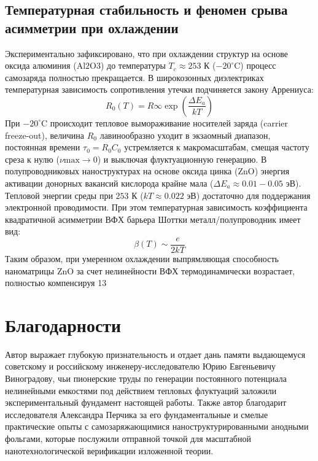 \documentclass[12pt,a4paper]{article}
\begin{document}
\subsection{Температурная стабильность и феномен срыва асимметрии при охлаждении}
Экспериментально зафиксировано, что при охлаждении структур на основе оксида алюминия ($\text{Al}2\text{O}3$) до температуры $T_c \approx 253$ К ($-20^\circ$C) процесс самозаряда полностью прекращается. В широкозонных диэлектриках температурная зависимость сопротивления утечки подчиняется закону Аррениуса:
\begin{equation}
R_0(T) = R{\infty} \exp\left( \frac{\Delta E_a}{kT} \right)
\end{equation}
При $-20^\circ$C происходит тепловое вымораживание носителей заряда (carrier freeze-out), величина $R_0$ лавинообразно уходит в экзаомный диапазон, постоянная времени $\tau_0 = R_0 C_0$ устремляется к макромасштабам, смещая частоту среза к нулю ($\nu{\text{max}} \to 0$) и выключая флуктуационную генерацию.
В полупроводниковых наноструктурах на основе оксида цинка ($\text{ZnO}$) энергия активации донорных вакансий кислорода крайне мала ($\Delta E_a \approx 0.01 - 0.05$ эВ). Тепловой энергии среды при $253$ К ($kT \approx 0.022$ эВ) достаточно для поддержания электронной проводимости. При этом температурная зависимость коэффициента квадратичной асимметрии ВФХ барьера Шоттки металл/полупроводник имеет вид:
\begin{equation}
\beta(T) \sim \frac{e}{2kT}
\end{equation}
Таким образом, при умеренном охлаждении выпрямляющая способность наноматрицы $\text{ZnO}$ за счет нелинейности ВФХ термодинамически возрастает, полностью компенсируя 13%
\section{Благодарности}
Автор выражает глубокую признательность и отдает дань памяти выдающемуся советскому и российскому инженеру-исследователю Юрию Евгеньевичу Виноградову, чьи пионерские труды по генерации постоянного потенциала нелинейными емкостями под действием тепловых флуктуаций заложили экспериментальный фундамент настоящей работы. Также автор благодарит исследователя Александра Перчика за его фундаментальные и смелые практические опыты с самозаряжающимися наноструктурированными анодными фольгами, которые послужили отправной точкой для масштабной нанотехнологической верификации изложенной теории.
\end{document}
